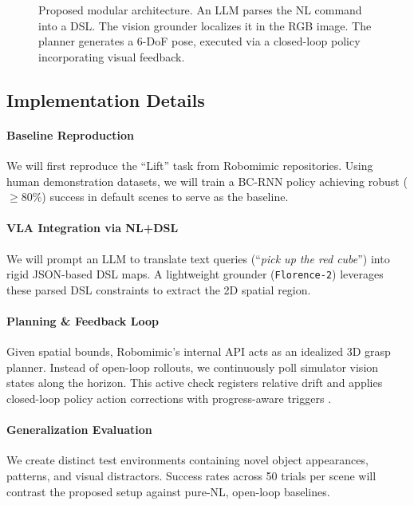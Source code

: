 \documentclass[conference]{IEEEtran}
\begin{document}
\begin{figure}[ht]
\caption{Proposed modular architecture. An LLM parses the NL command into a DSL. The vision grounder localizes it in the RGB image. The planner generates a 6-DoF pose, executed via a closed-loop policy incorporating visual feedback.}
\label{fig:architecture}
\end{figure}


\subsection{Implementation Details}

\paragraph{Baseline Reproduction}
We will first reproduce the ``Lift'' task from Robomimic repositories. Using human demonstration datasets, we will train a BC-RNN policy achieving robust ($\ge 80\%$) success in default scenes to serve as the baseline.

\paragraph{VLA Integration via NL+DSL}
We will prompt an LLM to translate text queries (``\textit{pick up the red cube}'') into rigid JSON-based DSL maps. A lightweight grounder (\texttt{Florence-2}) leverages these parsed DSL constraints to extract the 2D spatial region.

\paragraph{Planning \& Feedback Loop}
Given spatial bounds, Robomimic's internal API acts as an idealized 3D grasp planner. Instead of open-loop rollouts, we continuously poll simulator vision states along the horizon. This active check registers relative drift and applies closed-loop policy action corrections with progress-aware triggers \cite{sprvla2026}.

\paragraph{Generalization Evaluation}
We create distinct test environments containing novel object appearances, patterns, and visual distractors. Success rates across 50 trials per scene will contrast the proposed setup against pure-NL, open-loop baselines.
\end{document}
